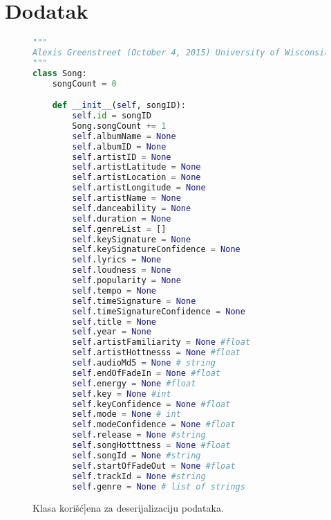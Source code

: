 \section{Dodatak}
\label{sec:DodatakIzvlacenje}

\begin{figure}[h]
\lstset{style=mystyle}
\begin{lstlisting}[language=Python, basicstyle=\footnotesize]
"""
Alexis Greenstreet (October 4, 2015) University of Wisconsin-Madison
"""
class Song:
    songCount = 0

    def __init__(self, songID):
        self.id = songID
        Song.songCount += 1
        self.albumName = None
        self.albumID = None
        self.artistID = None
        self.artistLatitude = None
        self.artistLocation = None
        self.artistLongitude = None
        self.artistName = None
        self.danceability = None
        self.duration = None
        self.genreList = []
        self.keySignature = None
        self.keySignatureConfidence = None
        self.lyrics = None
        self.loudness = None
        self.popularity = None
        self.tempo = None
        self.timeSignature = None
        self.timeSignatureConfidence = None
        self.title = None
        self.year = None
        self.artistFamiliarity = None #float
        self.artistHottnesss = None #float
        self.audioMd5 = None # string
        self.endOfFadeIn = None #float
        self.energy = None #float
        self.key = None #int
        self.keyConfidence = None #float
        self.mode = None # int
        self.modeConfidence = None #float
        self.release = None #string
        self.songHotttness = None #float
        self.songId = None #string
        self.startOfFadeOut = None #float
        self.trackId = None #string
        self.genre = None # list of strings
\end{lstlisting}
\label{code:ConvertToCSV}
\caption{Klasa kori\v{s}\'c{]ena za deserijalizaciju podataka.}}
\end{figure}

